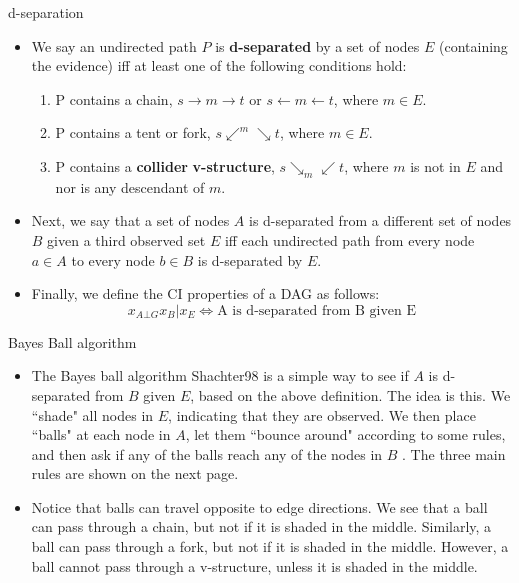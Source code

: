 \documentclass[10pt,mathserif]{beamer}
\begin{document}
\begin{frame}{d-separation}
\begin{itemize}
    \item We say an undirected path $P$ is \textbf{d-separated} by a set of nodes $E$ (containing the evidence) iff at least one of the following conditions hold:
    \begin{enumerate}
        \item P contains a chain, $s\rightarrow m \rightarrow t$ or $ s\leftarrow m \leftarrow t$, where $m\in E$.
        \item P contains a tent or fork, $s\swarrow^m \searrow t$, where $m\in E$.
        \item P contains a \textbf{collider} \textbf{v-structure}, $s\searrow_m\swarrow t$, where $m$ is not in $E$ and nor is any descendant of $m$.
    \end{enumerate}
    
    \item Next, we say that a set of nodes $A$ is d-separated from a different set of nodes $B$ given a third observed set $E$ iff each undirected path from every node $a \in A$ to every node $b \in B$ is d-separated by $E$.
    
    \item Finally, we define the CI properties of a DAG as follows:
    \begin{equation}
        x_{A \bot G} x_B |x_E \Longleftrightarrow \text{A is d-separated from B given E}
    \end{equation}
\end{itemize}  
\end{frame}

\begin{frame}{Bayes Ball algorithm}
\begin{itemize}
    \item  The Bayes ball algorithm Shachter98 is a simple way to see if $A$ is d-separated from $B$ given $E$, based on the above definition. The idea is this. We ``shade" all nodes in $E$, indicating that they are observed. We then place ``balls" at each node in $A$, let them ``bounce around" according to some rules, and then ask if any of the balls reach any of the nodes in $B$ . The three main rules are shown on the next page.
    \item  Notice that balls can travel opposite to edge directions. We see that a ball can pass through a chain, but not if it is shaded in the middle. Similarly, a ball can pass through a fork, but not if it is shaded in the middle. However, a ball cannot pass through a v-structure, unless it is shaded in the middle.
\end{itemize}
\end{frame}
\end{document}
